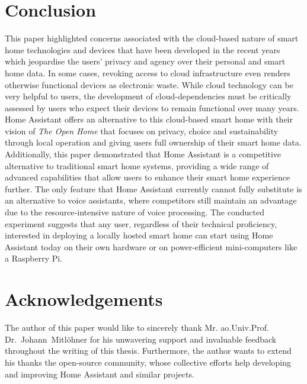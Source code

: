 
\section{Conclusion}

This paper highlighted concerns associated with the cloud-based nature of smart home technologies and devices that have been developed in the recent years which jeopardise the users' privacy and agency over their personal and smart home data. In some cases, revoking access to cloud infrastructure even renders otherwise functional devices as electronic waste. While cloud technology can be very helpful to users, the development of cloud-dependencies must be critically assessed by users who expect their devices to remain functional over many years. Home Assistant offers an alternative to this cloud-based smart home with their vision of \textit{The Open Home} that focuses on privacy, choice and sustainability through local operation and giving users full ownership of their smart home data. Additionally, this paper demonstrated that Home Assistant is a competitive alternative to traditional smart home systems, providing a wide range of advanced capabilities that allow users to enhance their smart home experience further. The only feature that Home Assistant currently cannot fully substitute is an alternative to voice assistants, where competitors still maintain an advantage due to the resource-intensive nature of voice processing. The conducted experiment suggests that any user, regardless of their technical proficiency, interested in deploying a locally hosted smart home can start using Home Assistant today on their own hardware or on power-efficient mini-computers like a Raspberry Pi.


\section*{Acknowledgements}

The author of this paper would like to sincerely thank Mr. ao.Univ.Prof. Dr.~Johann~Mitl\"ohner for his unwavering support and invaluable feedback throughout the writing of this thesis. Furthermore, the author wants to extend his thanks the open-source community, whose collective efforts help developing and improving Home Assistant and similar projects.